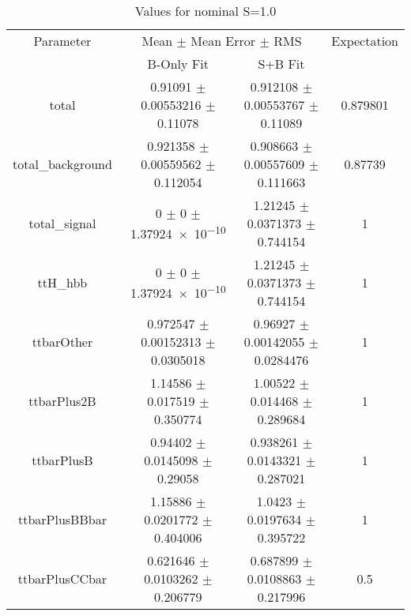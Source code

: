 \begin{table}
\centering
\caption{Values for nominal S=1.0}
\begin{tabular}{cccc}
\toprule
Parameter & \multicolumn{2}{c}{Mean $\pm$ Mean Error $\pm$ RMS} & Expectation\\
 & B-Only Fit & S+B Fit & \\
\midrule
total & \num{0.91091} $\pm$ \num{0.00553216} $\pm$ \num{0.11078} & \num{0.912108} $\pm$ \num{0.00553767} $\pm$ \num{0.11089} & \num{0.879801}\\
total\_background & \num{0.921358} $\pm$ \num{0.00559562} $\pm$ \num{0.112054} & \num{0.908663} $\pm$ \num{0.00557609} $\pm$ \num{0.111663} & \num{0.87739}\\
total\_signal & \num{0} $\pm$ \num{0} $\pm$ \num{1.37924e-10} & \num{1.21245} $\pm$ \num{0.0371373} $\pm$ \num{0.744154} & \num{1}\\
ttH\_hbb & \num{0} $\pm$ \num{0} $\pm$ \num{1.37924e-10} & \num{1.21245} $\pm$ \num{0.0371373} $\pm$ \num{0.744154} & \num{1}\\
ttbarOther & \num{0.972547} $\pm$ \num{0.00152313} $\pm$ \num{0.0305018} & \num{0.96927} $\pm$ \num{0.00142055} $\pm$ \num{0.0284476} & \num{1}\\
ttbarPlus2B & \num{1.14586} $\pm$ \num{0.017519} $\pm$ \num{0.350774} & \num{1.00522} $\pm$ \num{0.014468} $\pm$ \num{0.289684} & \num{1}\\
ttbarPlusB & \num{0.94402} $\pm$ \num{0.0145098} $\pm$ \num{0.29058} & \num{0.938261} $\pm$ \num{0.0143321} $\pm$ \num{0.287021} & \num{1}\\
ttbarPlusBBbar & \num{1.15886} $\pm$ \num{0.0201772} $\pm$ \num{0.404006} & \num{1.0423} $\pm$ \num{0.0197634} $\pm$ \num{0.395722} & \num{1}\\
ttbarPlusCCbar & \num{0.621646} $\pm$ \num{0.0103262} $\pm$ \num{0.206779} & \num{0.687899} $\pm$ \num{0.0108863} $\pm$ \num{0.217996} & \num{0.5}\\
\bottomrule
\end{tabular}
\end{table}